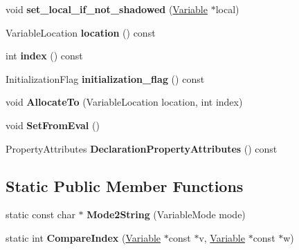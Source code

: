 \begin{DoxyCompactItemize}
\item 
void {\bfseries set\+\_\+local\+\_\+if\+\_\+not\+\_\+shadowed} (\hyperlink{classv8_1_1internal_1_1_variable}{Variable} $\ast$local)\hypertarget{classv8_1_1internal_1_1_variable_a89aa95ef6d4226e3ca0c9a862e27e252}{}\label{classv8_1_1internal_1_1_variable_a89aa95ef6d4226e3ca0c9a862e27e252}

\item 
Variable\+Location {\bfseries location} () const \hypertarget{classv8_1_1internal_1_1_variable_a6ab74d3db1983c3a7e5bb12ccdd0e7c7}{}\label{classv8_1_1internal_1_1_variable_a6ab74d3db1983c3a7e5bb12ccdd0e7c7}

\item 
int {\bfseries index} () const \hypertarget{classv8_1_1internal_1_1_variable_a690fec1d7aa85f398361cbadb6cc9b3f}{}\label{classv8_1_1internal_1_1_variable_a690fec1d7aa85f398361cbadb6cc9b3f}

\item 
Initialization\+Flag {\bfseries initialization\+\_\+flag} () const \hypertarget{classv8_1_1internal_1_1_variable_a9ac58f8c846bcc880e49d563114a5222}{}\label{classv8_1_1internal_1_1_variable_a9ac58f8c846bcc880e49d563114a5222}

\item 
void {\bfseries Allocate\+To} (Variable\+Location location, int index)\hypertarget{classv8_1_1internal_1_1_variable_a681c73bd527b5d39181755b8c0221370}{}\label{classv8_1_1internal_1_1_variable_a681c73bd527b5d39181755b8c0221370}

\item 
void {\bfseries Set\+From\+Eval} ()\hypertarget{classv8_1_1internal_1_1_variable_a06fbb2a5d377bfb210bae0f0d3ce4489}{}\label{classv8_1_1internal_1_1_variable_a06fbb2a5d377bfb210bae0f0d3ce4489}

\item 
Property\+Attributes {\bfseries Declaration\+Property\+Attributes} () const \hypertarget{classv8_1_1internal_1_1_variable_a3e541f3f843284fe831f17f6c104fc93}{}\label{classv8_1_1internal_1_1_variable_a3e541f3f843284fe831f17f6c104fc93}

\end{DoxyCompactItemize}
\subsection*{Static Public Member Functions}
\begin{DoxyCompactItemize}
\item 
static const char $\ast$ {\bfseries Mode2\+String} (Variable\+Mode mode)\hypertarget{classv8_1_1internal_1_1_variable_a0750ffbed760edd621661223d0c1ac12}{}\label{classv8_1_1internal_1_1_variable_a0750ffbed760edd621661223d0c1ac12}

\item 
static int {\bfseries Compare\+Index} (\hyperlink{classv8_1_1internal_1_1_variable}{Variable} $\ast$const $\ast$v, \hyperlink{classv8_1_1internal_1_1_variable}{Variable} $\ast$const $\ast$w)\hypertarget{classv8_1_1internal_1_1_variable_aefe29b283ce5a634b217028445caf95c}{}\label{classv8_1_1internal_1_1_variable_aefe29b283ce5a634b217028445caf95c}

\end{DoxyCompactItemize}
